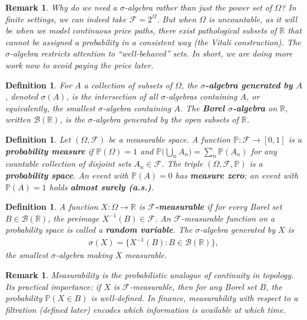 \documentclass{report}
\theoremstyle{spacedplain}
\theoremstyle{spaceddefinition}
\newtheorem{definition}[theorem]{Definition}
\theoremstyle{spacedremark}
\newtheorem{remark}[theorem]{Remark}
\begin{document}
\begin{remark}
Why do we need a $\sigma$-algebra rather than just the power set of $\Omega$? In finite settings, we can indeed take $\mathcal{F} = 2^\Omega$. But when $\Omega$ is uncountable, as it will be when we model continuous price paths, there exist pathological subsets of $\mathbb{R}$ that cannot be assigned a probability in a consistent way (the Vitali construction). The $\sigma$-algebra restricts attention to ``well-behaved'' sets. In short, we are doing more work now to avoid paying the price later.
\end{remark}

\begin{definition}
For $A$ a collection of subsets of $\Omega$, the \textbf{$\sigma$-algebra generated by $A$}, denoted $\sigma(A)$, is the intersection of all $\sigma$-algebras containing $A$, or equivalently, the smallest $\sigma$-algebra containing $A$. The \textbf{Borel $\sigma$-algebra} on $\mathbb{R}$, written $\mathcal{B}(\mathbb{R})$, is the $\sigma$-algebra generated by the open subsets of $\mathbb{R}$.
\end{definition}

\begin{definition}
Let $(\Omega, \mathcal{F})$ be a measurable space. A function $\mathbb{P}: \mathcal{F} \to [0,1]$ is a \textbf{probability measure} if $\mathbb{P}(\Omega) = 1$ and $\mathbb{P}\bigl(\bigcup_n A_n\bigr) = \sum_n \mathbb{P}(A_n)$ for any countable collection of disjoint sets $A_n \in \mathcal{F}$. The triple $(\Omega, \mathcal{F}, \mathbb{P})$ is a \textbf{probability space}. An event with $\mathbb{P}(A)=0$ has \textbf{measure zero}; an event with $\mathbb{P}(A)=1$ holds \textbf{almost surely (a.s.)}.
\end{definition}

\begin{definition}
A function $X: \Omega \to \mathbb{R}$ is \textbf{$\mathcal{F}$-measurable} if for every Borel set $B \in \mathcal{B}(\mathbb{R})$, the preimage $X^{-1}(B) \in \mathcal{F}$. An $\mathcal{F}$-measurable function on a probability space is called a \textbf{random variable}. The $\sigma$-algebra generated by $X$ is
\begin{align}
    \sigma(X) = \{X^{-1}(B) : B \in \mathcal{B}(\mathbb{R})\},
\end{align}
the smallest $\sigma$-algebra making $X$ measurable.
\end{definition}

\begin{remark}
Measurability is the probabilistic analogue of continuity in topology. Its practical importance: if $X$ is $\mathcal{F}$-measurable, then for any Borel set $B$, the probability $\mathbb{P}(X \in B)$ is well-defined. In finance, measurability with respect to a filtration (defined later) encodes which information is available at which time.
\end{remark}
\end{document}
